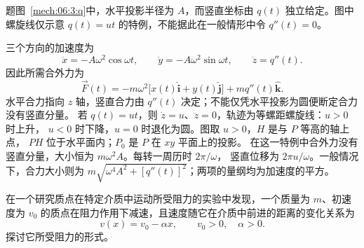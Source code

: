 {\begin{origexamplebox}{}
\begin{qualityfigure}
\label{mech:06:3:q}
\end{qualityfigure}
\end{origexamplebox}

\begin{xesolution}题图~\ref{mech:06:3:q}中，水平投影半径为 $A$，而竖直坐标由 $q(t)$ 独立给定。图中螺旋线仅示意 $q(t)=ut$ 的特例，不能据此在一般情形中令 $q''(t)=0$。

三个方向的加速度为
\[
  \ddot x=-A\omega^2\cos\omega t,
  \qquad
  \ddot y=-A\omega^2\sin\omega t,
  \qquad
  \ddot z=q''(t).
\]
因此所需合外力为
\[
  \boxed{\vec F(t)=
  -m\omega^2\bigl[x(t)\hat{\boldsymbol i}+y(t)\hat{\boldsymbol j}\bigr]
  +mq''(t)\hat{\boldsymbol k}}.
\]
水平合力指向 $z$ 轴，竖直合力由 $q''(t)$ 决定；不能仅凭水平投影为圆便断定合力没有竖直分量。
若 $q(t)=ut$，则 $\dot z=u$、$\ddot z=0$，轨迹为等螺距螺旋线：$u>0$ 时上升，
$u<0$ 时下降，$u=0$ 时退化为圆。图取 $u>0$，$H$ 是与 $P$ 等高的轴上点，
$PH$ 位于水平面内；$P_0$ 是 $P$ 在 $xy$ 平面上的投影。
\soldiagTwoThree
在这一特例中合外力没有竖直分量，大小恒为 $m\omega^2A$。每转一周历时 $2\pi/\omega$，
竖直位移为 $2\pi u/\omega$。一般情况下，合力大小则为
$m\sqrt{\omega^4A^2+[q''(t)]^2}$；两项的量纲均为加速度的平方。
\end{xesolution}

\begin{origexamplebox}{}\label{ch06:ex:s04-2-4}
在一个研究质点在特定介质中运动所受阻力的实验中发现，一个质量为 $m$、初速度为 $v_0$
的质点在阻力作用下减速，且速度随它在介质中前进的距离的变化关系为
\[
  v(x)=v_0-\alpha x,\qquad v_0>0,\quad\alpha>0.
\]
探讨它所受阻力的形式。

\begin{qualityfigure}
\label{mech:06:4:q}
\end{qualityfigure}
\end{origexamplebox}

}

